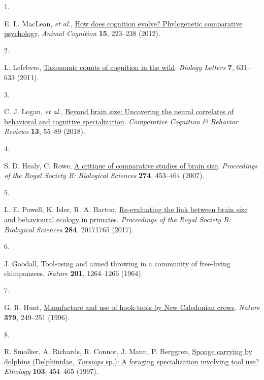 \documentclass[
  man,floatsintext]{apa6}
\newlength{\cslhangindent}
\newlength{\csllabelwidth}
\newlength{\cslentryspacingunit} %
\newenvironment{CSLReferences}[2] %
 {%
  \setlength{\parindent}{0pt}
  \ifodd #1
  \let\oldpar\par
  \def\par{\hangindent=\cslhangindent\oldpar}
  \fi
  \setlength{\parskip}{#2\cslentryspacingunit}
 }%
 {}
\newcommand{\CSLLeftMargin}[1]{\parbox[t]{\csllabelwidth}{#1}}
\newcommand{\CSLRightInline}[1]{\parbox[t]{\linewidth - \csllabelwidth}{#1}\break}
\begin{document}
\hypertarget{refs}{}
\begin{CSLReferences}{0}{0}
\leavevmode{}%
\CSLLeftMargin{1. }%
\CSLRightInline{E. L. MacLean, \emph{et al.}, \href{https://doi.org/10.1007/s10071-011-0448-8}{How does cognition evolve? Phylogenetic comparative psychology}. \emph{Animal Cognition} \textbf{15}, 223--238 (2012).}

\leavevmode{}%
\CSLLeftMargin{2. }%
\CSLRightInline{L. Lefebvre, \href{https://doi.org/10.1098/rsbl.2010.0556}{Taxonomic counts of cognition in the wild}. \emph{Biology Letters} \textbf{7}, 631--633 (2011).}

\leavevmode{}%
\CSLLeftMargin{3. }%
\CSLRightInline{C. J. Logan, \emph{et al.}, \href{https://doi.org/10.3819/CCBR.2018.130008}{Beyond brain size: Uncovering the neural correlates of behavioral and cognitive specialization}. \emph{Comparative Cognition \& Behavior Reviews} \textbf{13}, 55--89 (2018).}

\leavevmode{}%
\CSLLeftMargin{4. }%
\CSLRightInline{S. D. Healy, C. Rowe, \href{https://doi.org/10.1098/rspb.2006.3748}{A critique of comparative studies of brain size}. \emph{Proceedings of the Royal Society B: Biological Sciences} \textbf{274}, 453--464 (2007).}

\leavevmode{}%
\CSLLeftMargin{5. }%
\CSLRightInline{L. E. Powell, K. Isler, R. A. Barton, \href{https://doi.org/10.1098/rspb.2017.1765}{Re-evaluating the link between brain size and behavioural ecology in primates}. \emph{Proceedings of the Royal Society B: Biological Sciences} \textbf{284}, 20171765 (2017).}

\leavevmode{}%
\CSLLeftMargin{6. }%
\CSLRightInline{J. Goodall, Tool-using and aimed throwing in a community of free-living chimpanzees. \emph{Nature} \textbf{201}, 1264--1266 (1964).}

\leavevmode{}%
\CSLLeftMargin{7. }%
\CSLRightInline{G. R. Hunt, \href{https://doi.org/10.1038/379249a0}{Manufacture and use of hook-tools by {N}ew {C}aledonian crows}. \emph{Nature} \textbf{379}, 249--251 (1996).}

\leavevmode{}%
\CSLLeftMargin{8. }%
\CSLRightInline{R. Smolker, A. Richards, R. Connor, J. Mann, P. Berggren, \href{https://doi.org/10.1111/j.1439-0310.1997.tb00160.x}{Sponge carrying by dolphins ({D}elphinidae, \emph{{T}ursiops} sp.): A foraging specialization involving tool use?} \emph{Ethology} \textbf{103}, 454--465 (1997).}


\end{CSLReferences}
\end{document}
